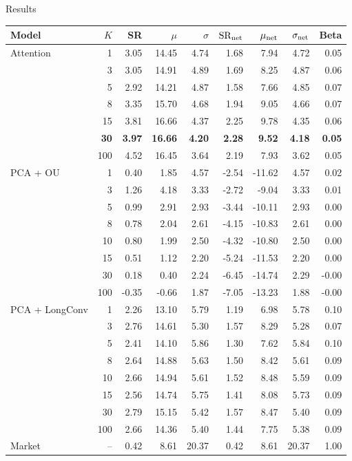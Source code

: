 \documentclass[11pt]{beamer}
\begin{document}
\begin{frame}{Results}

\begin{center}
{\fontsize{6.4}{7.4}\selectfont
\setlength{\tabcolsep}{1.6pt}
\renewcommand{\arraystretch}{.90}

\begin{tabular}{@{}lrrrrrrrr@{}}
\toprule
Model & $K$ & SR & $\mu$ & $\sigma$
& $\mathrm{SR}_{\rm net}$ & $\mu_{\rm net}$
& $\sigma_{\rm net}$ & Beta\\
\midrule
Attention & 1 & 3.05 & 14.45 & 4.74 & 1.68 & 7.94 & 4.72 & 0.05\\
 & 3 & 3.05 & 14.91 & 4.89 & 1.69 & 8.25 & 4.87 & 0.06\\
 & 5 & 2.92 & 14.21 & 4.87 & 1.58 & 7.66 & 4.85 & 0.07\\
 & 8 & 3.35 & 15.70 & 4.68 & 1.94 & 9.05 & 4.66 & 0.07\\
 & 15 & 3.81 & 16.66 & 4.37 & 2.25 & 9.78 & 4.35 & 0.06\\
 & \textbf{30} & \textbf{3.97} & \textbf{16.66}
 & \textbf{4.20} & \textbf{2.28} & \textbf{9.52}
 & \textbf{4.18} & \textbf{0.05}\\
 & 100 & 4.52 & 16.45 & 3.64 & 2.19 & 7.93 & 3.62 & 0.05\\
\midrule
PCA + OU & 1 & 0.40 & 1.85 & 4.57 & -2.54 & -11.62 & 4.57 & 0.02\\
 & 3 & 1.26 & 4.18 & 3.33 & -2.72 & -9.04 & 3.33 & 0.01\\
 & 5 & 0.99 & 2.91 & 2.93 & -3.44 & -10.11 & 2.93 & 0.00\\
 & 8 & 0.78 & 2.04 & 2.61 & -4.15 & -10.83 & 2.61 & 0.00\\
 & 10 & 0.80 & 1.99 & 2.50 & -4.32 & -10.80 & 2.50 & 0.00\\
 & 15 & 0.51 & 1.12 & 2.20 & -5.24 & -11.53 & 2.20 & 0.00\\
 & 30 & 0.18 & 0.40 & 2.24 & -6.45 & -14.74 & 2.29 & -0.00\\
 & 100 & -0.35 & -0.66 & 1.87 & -7.05 & -13.23 & 1.88 & -0.00\\
\midrule
PCA + LongConv & 1 & 2.26 & 13.10 & 5.79 & 1.19 & 6.98 & 5.78 & 0.10\\
 & 3 & 2.76 & 14.61 & 5.30 & 1.57 & 8.29 & 5.28 & 0.07\\
 & 5 & 2.41 & 14.10 & 5.86 & 1.30 & 7.62 & 5.84 & 0.10\\
 & 8 & 2.64 & 14.88 & 5.63 & 1.50 & 8.42 & 5.61 & 0.09\\
 & 10 & 2.66 & 14.94 & 5.61 & 1.52 & 8.48 & 5.59 & 0.09\\
 & 15 & 2.56 & 14.74 & 5.75 & 1.41 & 8.08 & 5.73 & 0.09\\
 & 30 & 2.79 & 15.15 & 5.42 & 1.57 & 8.47 & 5.40 & 0.09\\
 & 100 & 2.66 & 14.36 & 5.40 & 1.44 & 7.75 & 5.38 & 0.09\\
\midrule
Market & -- & 0.42 & 8.61 & 20.37 & 0.42 & 8.61 & 20.37 & 1.00\\
\bottomrule
\end{tabular}
\par}
\end{center}


\end{frame}
\end{document}
